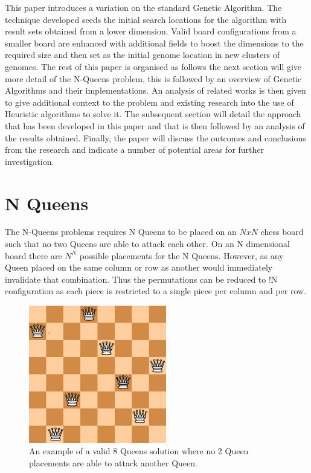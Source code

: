 \documentclass[conference]{IEEEtran}
\begin{document}
This paper introduces a variation on the standard Genetic Algorithm. The technique developed seeds the initial search locations for the algorithm with result sets obtained from a lower dimension. Valid board configurations from a smaller board are enhanced with additional fields to boost the dimensions to the required size and then set as the initial genome location in new clusters of genomes. The rest of this paper is organised as follows the next section will give more detail of the N-Queens problem, this is followed by an overview of Genetic Algorithms and their implementations. An analysis of related works is then given to give additional context to the problem and existing research into the use of Heuristic algorithms to solve it. The subsequent section will detail the approach that has been developed in this paper and that is then followed by an analysis of the results obtained. Finally, the paper will discuss the outcomes and conclusions from the research and indicate a number of potential areas for further investigation.

\section{N Queens}
The N-Queens problems requires N Queens to be placed on an $NxN$ chess board such that no two Queens are able to attack each other. On an N dimensional board there are $N^{N}$ possible placements for the N Queens. However, as any Queen placed on the same column or row as another would immediately invalidate that combination. Thus the permutations can be reduced to !N configuration as each piece is restricted to a single piece per column and per row.

\begin{figure}[!htbp]
	\centering	
	\includegraphics[width=6cm, height=6cm]{Valid8QueensSolution}
	\caption{An example of a valid 8 Queens solution where no 2 Queen placements are able to attack another Queen.}
\end{figure}
\end{document}
